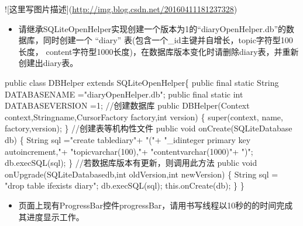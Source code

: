 \documentclass[9pt, b5paper]{article}
\begin{document}
![这里写图片描述](\url{http://img.blog.csdn.net/20160411181237328})
\begin{itemize}
\item 请继承SQLiteOpenHelper实现创建一个版本为1的“diaryOpenHelper.db”的数据库，同时创建一个 “diary” 表(包含一个\_id主键并自增长，topic字符型100长度， content字符型1000长度)，在数据库版本变化时请删除diary表，并重新创建出diary表。
\end{itemize}
public class DBHelper extends SQLiteOpenHelper\{
public final static String DATABASENAME ="diaryOpenHelper.db";
public final static int DATABASEVERSION =1;
//创建数据库
public DBHelper(Context context,Stringname,CursorFactory factory,int version)
\{
super(context, name, factory,version);
\}
//创建表等机构性文件
public void onCreate(SQLiteDatabase db)
\{
String sql ="create tablediary"+
"("+
"\_idinteger primary key autoincrement,"+
"topicvarchar(100),"+
"contentvarchar(1000)"+
")";
db.execSQL(sql);
\}
//若数据库版本有更新，则调用此方法
public void onUpgrade(SQLiteDatabasedb,int oldVersion,int newVersion)
\{
String sql = "drop table ifexists diary";
db.execSQL(sql);
this.onCreate(db);
\}
\}
\begin{itemize}
\item 页面上现有ProgressBar控件progressBar，请用书写线程以10秒的的时间完成其进度显示工作。
\end{itemize}
\end{document}
